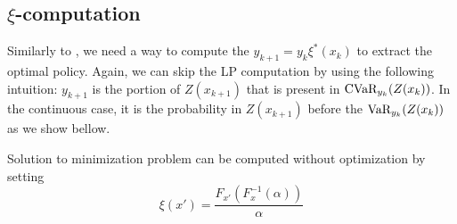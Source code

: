 \subsection{$\xi$-computation}

Similarly to , we need a way to compute the $y_{k+1}=y_{k}\xi^*(x_k)$ to extract the optimal policy. Again, we can skip the LP computation by using the following intuition: $y_{k+1}$ is the portion of $Z(x_{k+1})$ that is present in $\text{CVaR}_{y_k}(Z(x_k))$. In the continuous case, it is the probability in $Z(x_{k+1})$ before the $\text{VaR}_{y_k}(Z(x_k))$ as we show bellow.


\begin{theorem}
Solution to minimization problem  can be computed without optimization by setting
\begin{equation}\label{eqn:xi-claim}
\xi ( x' ) = \dfrac{F_{x'}(F^{-1}_x(\alpha))}{\alpha} 
\end{equation}
\end{theorem}

